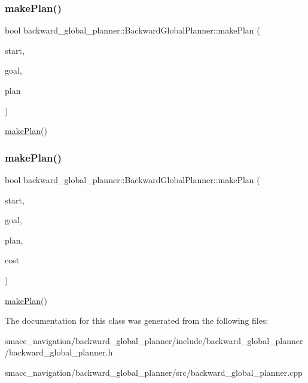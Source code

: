 \subsubsection{\texorpdfstring{make\+Plan()}{makePlan()}\hspace{0.1cm}{\footnotesize\ttfamily [1/2]}}
{\footnotesize\ttfamily bool backward\+\_\+global\+\_\+planner\+::\+Backward\+Global\+Planner\+::make\+Plan (\begin{DoxyParamCaption}\item[{const geometry\+\_\+msgs\+::\+Pose\+Stamped \&}]{start,  }\item[{const geometry\+\_\+msgs\+::\+Pose\+Stamped \&}]{goal,  }\item[{std\+::vector$<$ geometry\+\_\+msgs\+::\+Pose\+Stamped $>$ \&}]{plan }\end{DoxyParamCaption})}

\hyperlink{classbackward__global__planner_1_1BackwardGlobalPlanner_a39f2e0d5090f0776942d7cd68eecbde1}{make\+Plan()} \mbox{\label{classbackward__global__planner_1_1BackwardGlobalPlanner_ade177af3c2a0660781f71e3c2ba0b343}} 
\subsubsection{\texorpdfstring{make\+Plan()}{makePlan()}\hspace{0.1cm}{\footnotesize\ttfamily [2/2]}}
{\footnotesize\ttfamily bool backward\+\_\+global\+\_\+planner\+::\+Backward\+Global\+Planner\+::make\+Plan (\begin{DoxyParamCaption}\item[{const geometry\+\_\+msgs\+::\+Pose\+Stamped \&}]{start,  }\item[{const geometry\+\_\+msgs\+::\+Pose\+Stamped \&}]{goal,  }\item[{std\+::vector$<$ geometry\+\_\+msgs\+::\+Pose\+Stamped $>$ \&}]{plan,  }\item[{double \&}]{cost }\end{DoxyParamCaption})}

\hyperlink{classbackward__global__planner_1_1BackwardGlobalPlanner_a39f2e0d5090f0776942d7cd68eecbde1}{make\+Plan()} 

The documentation for this class was generated from the following files\+:\begin{DoxyCompactItemize}
\item 
smacc\+\_\+navigation/backward\+\_\+global\+\_\+planner/include/backward\+\_\+global\+\_\+planner/backward\+\_\+global\+\_\+planner.\+h\item 
smacc\+\_\+navigation/backward\+\_\+global\+\_\+planner/src/backward\+\_\+global\+\_\+planner.\+cpp\end{DoxyCompactItemize}
